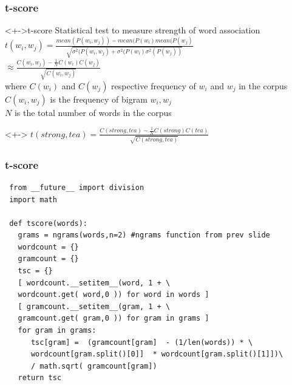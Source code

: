 \documentclass[serif,11pt,aspectratio=1610,table]{beamer}
\begin{document}
\begin{frame}[fragile]
 \frametitle{t-score}
 \begin{block}<+->{t-score}
  Statistical test to measure strength of word association \\
  $ t(w_{i},w_{j}) = \frac{mean(P(w_{i},w_{j})) - mean(P(w_{i}) mean(P(w_{j})}{\sqrt{\sigma^{2}(P(w_{i},w_{j}) + \sigma^{2}(P(w_{i}) \sigma^{2}(P(w_{j})  ) }}$ \\
  $\approx \frac{C(w_{i},w_{j}) - \frac{1}{N} C(w_{i}) C(w_{j})}{\sqrt{C(w_{i},w_{j})}}$ \\ %
  where $C(w_{i})$ and $C(w_{j})$ respective frequency of $w_{i}$ and $w_{j}$ in the corpus \\
 $C(w_{i},w_{j})$ is the frequency of bigram $w_{i},w_{j}$ \\
 $N$ is the total number of words in the corpus
 \end{block}

 \begin{block}<+->{}
  $ t(strong,tea) = \frac{C(strong,tea) - \frac{1}{N} C(strong) C(tea)}{\sqrt{C(strong,tea)}}$ \\
 
 \end{block}
\end{frame}


\begin{frame}[fragile]
 \frametitle{t-score}
\footnotesize
\begin{verbatim}
 from __future__ import division
 import math

 def tscore(words):
   grams = ngrams(words,n=2) #ngrams function from prev slide
   wordcount = {}
   gramcount = {}
   tsc = {}
   [ wordcount.__setitem__(word, 1 + \
   wordcount.get( word,0 )) for word in words ]
   [ gramcount.__setitem__(gram, 1 + \
   gramcount.get( gram,0 )) for gram in grams ]
   for gram in grams:
      tsc[gram] =  (gramcount[gram]  - (1/len(words)) * \
      wordcount[gram.split()[0]]  * wordcount[gram.split()[1]])\
      / math.sqrt( gramcount[gram])
   return tsc
\end{verbatim}

\end{frame}
\end{document}
